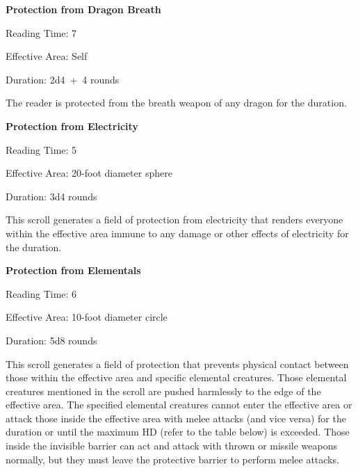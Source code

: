 \begin{multicols}{2}
\begin{minipage}{\columnwidth}
\noindent \textbf{Protection from Dragon Breath}

\noindent Reading Time: 7

\noindent Effective Area: Self

\noindent Duration: 2d4~+~4 rounds

\end{minipage}

The reader is protected from the breath weapon of any dragon for the duration. 

\vspace{1em}
\noindent \begin{minipage}{\columnwidth}

\noindent \textbf{Protection from Electricity}

\noindent Reading Time: 5

\noindent Effective Area: 20-foot diameter sphere

\noindent Duration: 3d4 rounds

\end{minipage}

This scroll generates a field of protection from electricity that renders everyone within the effective area immune to any damage or other effects of electricity for the duration.

\vspace{1em}
\noindent \begin{minipage}{\columnwidth}

\noindent \textbf{Protection from Elementals}

\noindent Reading Time: 6

\noindent Effective Area: 10-foot diameter circle

\noindent Duration: 5d8 rounds

\end{minipage}

This scroll generates a field of protection that prevents physical contact between those within the effective area and specific elemental creatures.  Those elemental creatures mentioned in the scroll are pushed harmlessly to the edge of the effective area.  The specified elemental creatures cannot enter the effective area or attack those inside the effective area with melee attacks (and vice versa) for the duration or until the maximum HD (refer to the table below) is exceeded.  Those inside the invisible barrier can act and attack with thrown or missile weapons normally, but they must leave the protective barrier to perform melee attacks.  


\end{multicols}
